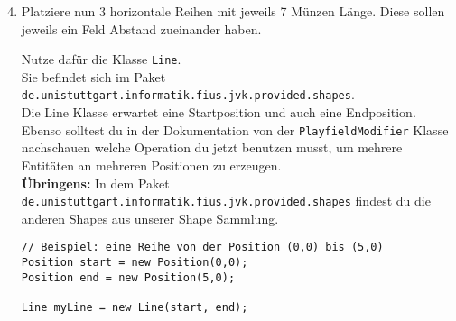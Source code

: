 \begin{enumerate} \setcounter{enumi}{3}
    \item Platziere nun 3 horizontale Reihen mit jeweils 7 Münzen Länge.
    Diese sollen jeweils ein Feld Abstand zueinander haben.
    
    Nutze dafür die Klasse \lstinline{Line}.\\
    Sie befindet sich im Paket \texttt{de.unistuttgart.informatik.fius.jvk.provided.shapes}.\\
    
    Die Line Klasse erwartet eine Startposition und auch eine Endposition.\\
    Ebenso solltest du in der Dokumentation von der \lstinline{PlayfieldModifier} Klasse nachschauen welche Operation du jetzt benutzen musst, um mehrere Entitäten an mehreren Positionen zu erzeugen.\\
    
    \textbf{Übringens:} In dem Paket \texttt{de.unistuttgart.informatik.fius.jvk.provided.shapes} findest du die anderen Shapes aus unserer Shape Sammlung.

    \begin{lstlisting}
// Beispiel: eine Reihe von der Position (0,0) bis (5,0)
Position start = new Position(0,0);
Position end = new Position(5,0);

Line myLine = new Line(start, end);
    \end{lstlisting}

\end{enumerate}

\newpage
